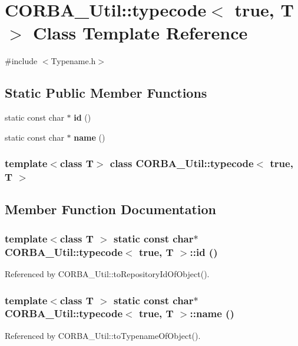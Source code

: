 \section{CORBA\_\-Util::typecode$<$ true, T $>$ Class Template Reference}
\label{classCORBA__Util_1_1typecode_3_01true_00_01T_01_4}


{\ttfamily \#include $<$Typename.h$>$}

\subsection*{Static Public Member Functions}
\begin{DoxyCompactItemize}
\item 
static const char $\ast$ {\bf id} ()
\item 
static const char $\ast$ {\bf name} ()
\end{DoxyCompactItemize}
\subsubsection*{template$<$class T$>$ class CORBA\_\-Util::typecode$<$ true, T $>$}



\subsection{Member Function Documentation}
\subsubsection[{id}]{\setlength{\rightskip}{0pt plus 5cm}template$<$class T $>$ static const char$\ast$ CORBA\_\-Util::typecode$<$ true, T $>$::id ()\hspace{0.3cm}{\ttfamily  [inline, static]}}\label{classCORBA__Util_1_1typecode_3_01true_00_01T_01_4_a5205cf4c0919b1dd43fe1b6ce31a4e38}


Referenced by CORBA\_\-Util::toRepositoryIdOfObject().

\subsubsection[{name}]{\setlength{\rightskip}{0pt plus 5cm}template$<$class T $>$ static const char$\ast$ CORBA\_\-Util::typecode$<$ true, T $>$::name ()\hspace{0.3cm}{\ttfamily  [inline, static]}}\label{classCORBA__Util_1_1typecode_3_01true_00_01T_01_4_a4b706bf265256aa4327c6a7ee6efba0e}


Referenced by CORBA\_\-Util::toTypenameOfObject().

